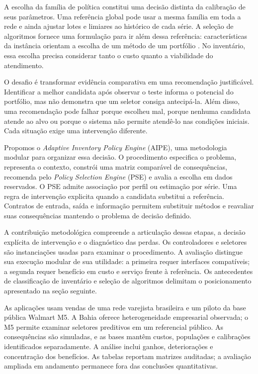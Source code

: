 \documentclass[preprint,12pt]{elsarticle}
\begin{document}
A escolha da família de política constitui uma decisão distinta da calibração de seus parâmetros. Uma referência global pode usar a mesma família em toda a rede e ainda ajustar lotes e limiares ao histórico de cada série. A seleção de algoritmos fornece uma formulação para ir além dessa referência: características da instância orientam a escolha de um método de um portfólio \cite{rice1976,Kotthoff2014AlgorithmSelection}. No inventário, essa escolha precisa considerar tanto o custo quanto a viabilidade do atendimento.

O desafio é transformar evidência comparativa em uma recomendação justificável. Identificar a melhor candidata após observar o teste informa o potencial do portfólio, mas não demonstra que um seletor consiga antecipá-la. Além disso, uma recomendação pode falhar porque escolheu mal, porque nenhuma candidata atende ao alvo ou porque o sistema não permite atendê-lo nas condições iniciais. Cada situação exige uma intervenção diferente.

Propomos o \textit{Adaptive Inventory Policy Engine} (AIPE), uma metodologia modular para organizar essa decisão. O procedimento especifica o problema, representa o contexto, constrói uma matriz comparável de consequências, recomenda pelo \textit{Policy Selection Engine} (PSE) e avalia a escolha em dados reservados. O PSE admite associação por perfil ou estimação por série. Uma regra de intervenção explicita quando a candidata substitui a referência. Contratos de entrada, saída e informação permitem substituir métodos e reavaliar suas consequências mantendo o problema de decisão definido.

A contribuição metodológica compreende a articulação dessas etapas, a decisão explícita de intervenção e o diagnóstico das perdas. Os controladores e seletores são instanciações usadas para examinar o procedimento. A avaliação distingue sua execução modular de sua utilidade: a primeira requer interfaces compatíveis; a segunda requer benefício em custo e serviço frente à referência. Os antecedentes de classificação de inventário e seleção de algoritmos delimitam o posicionamento apresentado na seção seguinte.

As aplicações usam vendas de uma rede varejista brasileira e um piloto da base pública Walmart M5. A Bahia oferece heterogeneidade empresarial observada; o M5 permite examinar seletores preditivos em um referencial público. As consequências são simuladas, e as bases mantêm custos, populações e calibrações identificados separadamente. A análise inclui ganhos, deteriorações e concentração dos benefícios. As tabelas reportam matrizes auditadas; a avaliação ampliada em andamento permanece fora das conclusões quantitativas.
\end{document}
